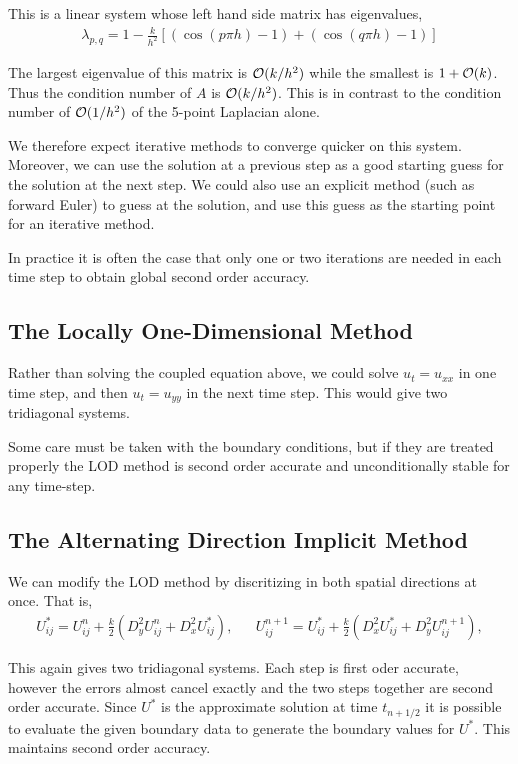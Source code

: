 \documentclass[12pt]{article}
\begin{document}
This is a linear system whose left hand side matrix has eigenvalues,
\begin{align*}
    \lambda_{p,q} = 1- \frac{k}{h^2} \left[ (\cos(p\pi h)-1) + (\cos(q\pi h)-1) \right]
\end{align*}

The largest eigenvalue of this matrix is \( \mathcal{O}(k/h^2) \) while the smallest is \( 1+\mathcal{O}(k) \). Thus the condition number of \( A \) is \( \mathcal{O}(k/h^2) \). This is in contrast to the condition number of \( \mathcal{O}(1/h^2) \) of the 5-point Laplacian alone.

We therefore expect iterative methods to converge quicker on this system. Moreover, we can use the solution at a previous step as a good starting guess for the solution at the next step. We could also use an explicit method (such as forward Euler) to guess at the solution, and use this guess as the starting point for an iterative method.

In practice it is often the case that only one or two iterations are needed in each time step to obtain global second order accuracy.

\subsection{The Locally One-Dimensional Method}
Rather than solving the coupled equation above, we could solve \( u_t = u_{xx} \) in one time step, and then \( u_t = u_{yy} \) in the next time step. This would give two tridiagonal systems. 

Some care must be taken with the boundary conditions, but if they are treated properly the LOD method is second order accurate and unconditionally stable for any time-step.

\subsection{The Alternating Direction Implicit Method}

We can modify the LOD method by discritizing in both spatial directions at once. That is,
\begin{align*}
    U_{ij}^* = U_{ij}^n + \frac{k}{2} \left( D_y^2 U_{ij}^n + D_x^2 U_{ij}^* \right),
    &&U_{ij}^{n+1} = U_{ij}^* + \frac{k}{2} \left( D_x^2 U_{ij}^* + D_y^2 U_{ij}^{n+1} \right),
\end{align*}

This again gives two tridiagonal systems. Each step is first oder accurate, however the errors almost cancel exactly and the two steps together are second order accurate. Since \( U^* \) is the approximate solution at time \( t_{n+1/2} \) it is possible to evaluate the given boundary data to generate the boundary values for \( U^* \). This maintains second order accuracy.
\end{document}
